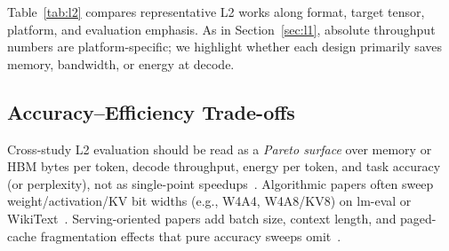 \documentclass[conference]{IEEEtran}
\begin{document}
Table~\ref{tab:l2} compares representative L2 works along format, target tensor, platform, and evaluation emphasis.
As in Section~\ref{sec:l1}, absolute throughput numbers are platform-specific; we highlight whether each design primarily saves memory, bandwidth, or energy at decode.

\begin{table}[t]
\caption{Representative mixed-precision attention and KV-cache schemes (L2).
KV = key--value cache; rot.\ = rotation-based outlier handling.}
\label{tab:l2}
\centering
\scriptsize
\setlength{\tabcolsep}{2pt}
\renewcommand{\arraystretch}{1.05}
\end{table}

\subsection{Accuracy--Efficiency Trade-offs}
\label{sec:l2-pareto}

Cross-study L2 evaluation should be read as a \emph{Pareto surface} over memory or HBM bytes per token, decode throughput, energy per token, and task accuracy (or perplexity), not as single-point speedups~\cite{sawint42026,batquant2026,bitdecoding2026,ultraquant2026}.
Algorithmic papers often sweep weight/activation/KV bit widths (e.g., W4A4, W4A8/KV8) on lm-eval or WikiText~\cite{ashkboos2024quarot,batquant2026,liu2024kivi}.
Serving-oriented papers add batch size, context length, and paged-cache fragmentation effects that pure accuracy sweeps omit~\cite{sawint42026,ultraquant2026,bitdecoding2026}.
\end{document}
